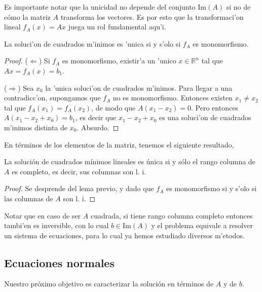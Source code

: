 Es importante notar que la unicidad no depende del conjunto $\text{Im}(A)$ si no de cómo la matriz $A$ transforma los vectores. Es por esto que la transformaci'on lineal $f_A(x) = Ax$ juega un rol fundamental aqu'i.

\begin{lema}
	La soluci'on de cuadrados m'inimos es 'unica si y s'olo si $f_A$ es monomorfismo.
	
\begin{proof}
	($\Leftarrow$) Si $f_A$ es monomorfismo, existir'a un 'unico $x \in \mathbb{R}^n$ tal que $Ax = f_A(x) = b_1$.
	 
	($\Rightarrow$) Sea $x_0$ la 'unica soluci'on de cuadrados m'inimos. Para llegar a una contradicc'on, supongamos que $f_A$ no es monomorfismo. Entonces existen $x_1 \neq x_2$ tal que $f_A(x_1) = f_A(x_2)$, de modo que $A(x_1 - x_2) = 0$. Pero entonces $A(x_1 - x_2 + x_0) = b_1$, es decir que $x_1 - x_2 + x_0$ es una soluci'on de cuadrados m'inimos distinta de $x_0$. Absurdo.
\end{proof}
\end{lema}

En términos de los elementos de la matriz, tenemos el siguiente resultado,

\begin{propo}
La solución de cuadrados mínimos lineales es única si y sólo el rango columna de $A$ es completo, es decir, sus columnas son l. i.

\begin{proof}
Se desprende del lema previo, y dado que $f_A$ es monomorfismo si y s'olo si las columnas de $A$ son l. i.
\end{proof}
\end{propo}

Notar que en caso de ser $A$ cuadrada, si tiene rango columna completo entonces tambi'en es inversible, con lo cual $b \in \text{Im}(A)$ y el problema equivale a resolver un sistema de ecuaciones, para lo cual ya hemos estudiado diversos m'etodos.

\subsection{Ecuaciones normales}

Nuestro próximo objetivo es caracterizar la solución en términos de $A$ y de $b$.

